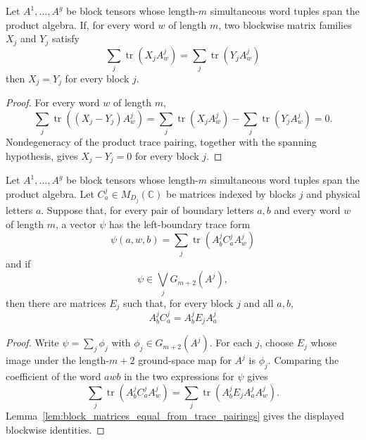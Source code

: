 \begin{lemma}
    \label{lem:block_matrices_equal_from_trace_pairings}
    \leanok
    Let \(A^1,\ldots,A^g\) be block tensors whose length-\(m\) simultaneous word
    tuples span the product algebra. If, for every word \(w\) of length \(m\),
    two blockwise matrix families \(X_j\) and \(Y_j\) satisfy
    \[
        \sum_j\operatorname{tr}(X_jA^j_w)
        =
        \sum_j\operatorname{tr}(Y_jA^j_w)
    \]
    then \(X_j=Y_j\) for every block \(j\).
\end{lemma}

\begin{proof}
    \leanok
    For every word \(w\) of length \(m\),
    \[
        \sum_j\operatorname{tr}\!\left((X_j-Y_j)A^j_w\right)
        =
        \sum_j\operatorname{tr}(X_jA^j_w)
        -
        \sum_j\operatorname{tr}(Y_jA^j_w)
        =
        0.
    \]
    Nondegeneracy of the product trace pairing, together with the spanning
    hypothesis, gives \(X_j-Y_j=0\) for every block \(j\).
\end{proof}

\begin{lemma}
    \label{lem:blockwise_boundary_identities_from_left_trace_membership}
    \leanok
    Let \(A^1,\ldots,A^g\) be block tensors whose length-\(m\) simultaneous word
    tuples span the product algebra. Let \(C^j_a\in M_{D_j}(\mathbb C)\) be
    matrices indexed by blocks \(j\) and physical letters \(a\). Suppose that,
    for every pair of boundary letters \(a,b\) and every word \(w\) of length
    \(m\), a vector \(\psi\) has the left-boundary trace form
    \[
        \psi(a,w,b)=
        \sum_j\operatorname{tr}\!\left(A^j_b C^j_a A^j_w\right)
    \]
    and if
    \[
        \psi\in\bigvee_j G_{m+2}(A^j),
    \]
    then there are matrices \(E_j\) such that, for every block \(j\) and all
    \(a,b\),
    \[
        A^j_bC^j_a=A^j_bE_jA^j_a
    \]
\end{lemma}

\begin{proof}
    \leanok
    Write \(\psi=\sum_j\phi_j\) with \(\phi_j\in G_{m+2}(A^j)\). For each
    \(j\), choose \(E_j\) whose image under the length-\(m+2\) ground-space map
    for \(A^j\) is \(\phi_j\). Comparing the coefficient of the word \(awb\)
    in the two expressions for \(\psi\) gives
    \[
        \sum_j\operatorname{tr}\!\left(A^j_b C^j_a A^j_w\right)
        =
        \sum_j\operatorname{tr}\!\left(A^j_bE_jA^j_aA^j_w\right).
    \]
    Lemma~\ref{lem:block_matrices_equal_from_trace_pairings} gives the displayed
    blockwise identities.
\end{proof}

